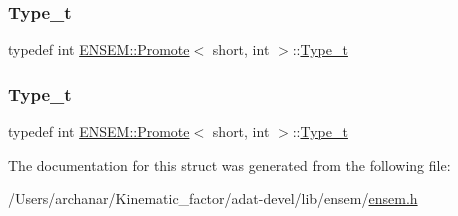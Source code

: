 \subsubsection{\texorpdfstring{Type\_t}{Type\_t}\hspace{0.1cm}{\footnotesize\ttfamily [2/3]}}
{\footnotesize\ttfamily typedef int \mbox{\hyperlink{structENSEM_1_1Promote}{E\+N\+S\+E\+M\+::\+Promote}}$<$ short, int $>$\+::\mbox{\hyperlink{structENSEM_1_1Promote_3_01short_00_01int_01_4_a6fb77c2428a4d51c4da789877c5a6e28}{Type\+\_\+t}}}

\mbox{\label{structENSEM_1_1Promote_3_01short_00_01int_01_4_a6fb77c2428a4d51c4da789877c5a6e28}} 
\subsubsection{\texorpdfstring{Type\_t}{Type\_t}\hspace{0.1cm}{\footnotesize\ttfamily [3/3]}}
{\footnotesize\ttfamily typedef int \mbox{\hyperlink{structENSEM_1_1Promote}{E\+N\+S\+E\+M\+::\+Promote}}$<$ short, int $>$\+::\mbox{\hyperlink{structENSEM_1_1Promote_3_01short_00_01int_01_4_a6fb77c2428a4d51c4da789877c5a6e28}{Type\+\_\+t}}}



The documentation for this struct was generated from the following file\+:\begin{DoxyCompactItemize}
\item 
/\+Users/archanar/\+Kinematic\+\_\+factor/adat-\/devel/lib/ensem/\mbox{\hyperlink{adat-devel_2lib_2ensem_2ensem_8h}{ensem.\+h}}\end{DoxyCompactItemize}
